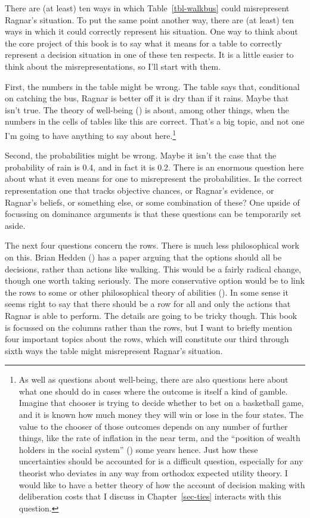\documentclass[
  12pt,
  letterpaper,
]{scrbook}
\begin{document}
There are (at least) ten ways in which Table~\ref{tbl-walkbus} could
misrepresent Ragnar's situation. To put the same point another way,
there are (at least) ten ways in which it could correctly represent his
situation. One way to think about the core project of this book is to
say what it means for a table to correctly represent a decision
situation in one of these ten respects. It is a little easier to think
about the misrepresentations, so I'll start with them.

First, the numbers in the table might be wrong. The table says that,
conditional on catching the bus, Ragnar is better off it is dry than if
it rains. Maybe that isn't true. The theory of well-being
() is about, among other
things, when the numbers in the cells of tables like this are correct.
That's a big topic, and not one I'm going to have anything to say about
here.\footnote{As well as questions about well-being, there are also
  questions here about what one should do in cases where the outcome is
  itself a kind of gamble. Imagine that chooser is trying to decide
  whether to bet on a basketball game, and it is known how much money
  they will win or lose in the four states. The value to the chooser of
  those outcomes depends on any number of further things, like the rate
  of inflation in the near term, and the ``position of wealth holders in
  the social system'' ()
  some years hence. Just how these uncertainties should be accounted for
  is a difficult question, especially for any theorist who deviates in
  any way from orthodox expected utility theory. I would like to have a
  better theory of how the account of decision making with deliberation
  costs that I discuss in Chapter~\ref{sec-ties} interacts with this
  question.}

Second, the probabilities might be wrong. Maybe it isn't the case that
the probability of rain is 0.4, and in fact it is 0.2. There is an
enormous question here about what it even means for one to misrepresent
the probabilities. Is the correct representation one that tracks
objective chances, or Ragnar's evidence, or Ragnar's beliefs, or
something else, or some combination of these? One upside of focussing on
dominance arguments is that these questions can be temporarily set
aside.

The next four questions concern the rows. There is much less
philosophical work on this. Brian Hedden
() has a paper arguing that the options
should all be decisions, rather than actions like walking. This would be
a fairly radical change, though one worth taking seriously. The more
conservative option would be to link the rows to some or other
philosophical theory of abilities (). In some sense it seems right to say that there should be a row
for all and only the actions that Ragnar is able to perform. The details
are going to be tricky though. This book is focussed on the columns
rather than the rows, but I want to briefly mention four important
topics about the rows, which will constitute our third through sixth
ways the table might misrepresent Ragnar's situation.
\end{document}
